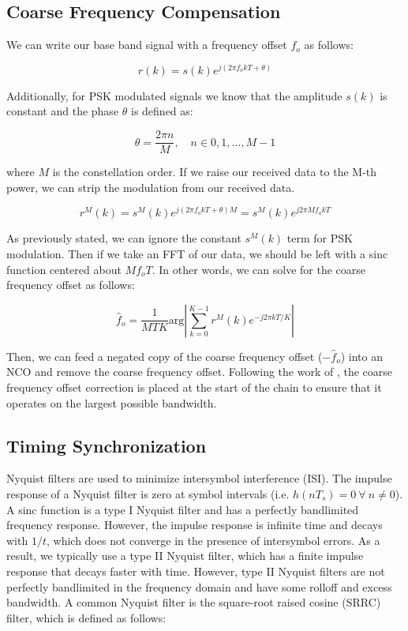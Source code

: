 \documentclass[conference,onecolumn]{IEEEtran}
\begin{document}
\subsection{Coarse Frequency Compensation}

We can write our base band signal with a frequency offset $f_o$ as follows:

\begin{equation}
	r(k) = s(k)e^{j(2{\pi}f_okT + \theta)}
\end{equation}

\noindent Additionally, for PSK modulated signals we know that the amplitude $s(k)$ is constant and the phase $\theta$ is defined as:

\begin{equation}
	\theta = \frac{2{\pi}n}{M},\quad n \in 0,1,...,M-1
\end{equation}

\noindent where $M$ is the constellation order. If we raise our received data to the M-th power, we can strip the modulation from our received data.

\begin{equation}
	r^M(k) = s^M(k)e^{j(2{\pi}f_okT + \theta)M} = s^M(k)e^{j2{\pi}Mf_okT}
\end{equation}

\noindent As previously stated, we can ignore the constant $s^M(k)$ term for PSK modulation. Then if we take an FFT of our data, we should be left with a sinc function centered about $Mf_oT$. In other words, we can solve for the coarse frequency offset as follows:

\begin{equation}
	\hat{f}_o = \frac{1}{MTK}\text{arg}\left|\sum_{k=0}^{K-1}{r^M(k)e^{-j2{\pi}kT/K}}\right|
\end{equation}

\noindent Then, we can feed a negated copy of the coarse frequency offset ($-\hat{f}_o$) into an NCO and remove the coarse frequency offset. Following the work of \cite{collins_2018_softwaredefined}, the coarse frequency offset correction is placed at the start of the chain to ensure that it operates on the largest possible bandwidth.
 
\subsection{Timing Synchronization}

Nyquist filters are used to minimize intersymbol interference (ISI). The impulse response of a Nyquist filter is zero at symbol intervals (i.e. $h(nT_s) = 0 \ \forall\ n \neq 0$). A sinc function is a type I Nyquist filter and has a perfectly bandlimited frequency response. However, the impulse response is infinite time and decays with $1/t$, which does not converge in the presence of intersymbol errors. As a result, we typically use a type II Nyquist filter, which has a finite impulse response that decays faster with time. However, type II Nyquist filters are not perfectly bandlimited in the frequency domain and have some rolloff and excess bandwidth. A common Nyquist filter is the square-root raised cosine (SRRC) filter, which is defined as follows:
 
\end{document}
